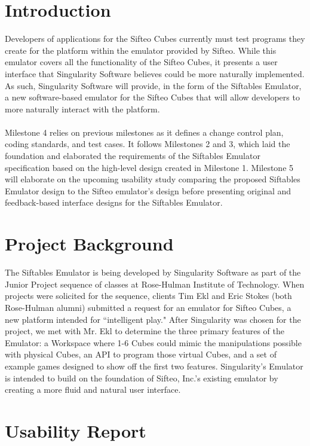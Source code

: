 \documentclass[12pt]{article}
\begin{document}
\section{Introduction}
Developers of applications for the \gls{Sifteo Cubes} currently must test programs they create for the platform within the emulator provided by Sifteo. While this emulator covers all  the functionality of the Sifteo Cubes, it presents a user interface that Singularity Software believes could be more naturally implemented. As such, Singularity Software will provide, in the form of the Siftables Emulator, a new software-based emulator for the Sifteo Cubes that will allow developers to more naturally interact with the platform.\\\\
Milestone 4 relies on previous milestones as it defines a change control plan, coding standards, and test cases. It follows Milestones 2 and 3, which laid the foundation and elaborated the requirements of the Siftables Emulator specification based on the high-level design created in Milestone 1. Milestone 5 will elaborate on the upcoming \gls{usability study} comparing the proposed Siftables Emulator design to the Sifteo emulator's design before presenting original and feedback-based interface designs for the Siftables Emulator.

\section{Project Background}
The Siftables Emulator is being developed by Singularity Software as part of the Junior Project sequence of classes at Rose-Hulman Institute of Technology. When projects were solicited for the sequence, clients Tim Ekl and Eric Stokes (both Rose-Hulman alumni) submitted a request for an emulator for Sifteo Cubes, a new platform intended for ``intelligent play." After Singularity was chosen for the project, we met with Mr. Ekl to determine the three primary features of the Emulator: a Workspace where 1-6 Cubes could mimic the manipulations possible with physical Cubes, an \gls{API} to program those virtual Cubes, and a set of example games designed to show off the first two features. Singularity's Emulator is intended to build on the foundation of Sifteo, Inc.'s existing emulator by creating a more fluid and natural user interface.

\section{Usability Report}
\end{document}

